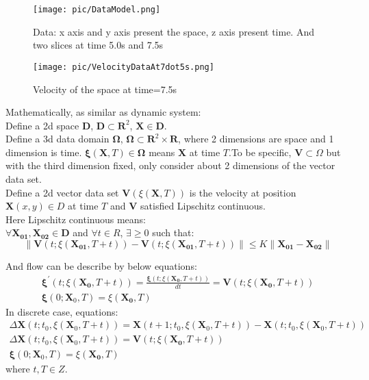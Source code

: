 \documentclass[
     11pt,         %
     a4paper,      %
     oneside,
     ]{article}
\newcommand{\vect}[1]{\boldsymbol{#1}}
\begin{document}
	\begin{figure}[H]
		\begin{minipage}{0.5\textwidth}
			\centering
			\texttt{[image: pic/DataModel.png]}
			\caption{\tiny Data: x axis and y axis present the space, z axis present time. And two slices at time 5.0s and 7.5s}
			\label{fig:DataModel}
		\end{minipage}
		\begin{minipage}{0.5\textwidth}
			\centering
			\texttt{[image: pic/VelocityDataAt7dot5s.png]}
			\caption{\tiny Velocity of the space at time=7.5s}
			\label{fig:VelocityDataAt7.5s}
		\end{minipage}
	\end{figure}	
	Mathematically, as similar as dynamic system:\\
	Define a 2d space $\vect{D}$,  $\vect{D}\subset \vect{R}^{2}$, $\vect{X}\in \vect{D}$.\\
	Define a 3d data domain $\vect{\Omega}$, $\vect{\Omega} \subset \vect{R}^{2}\times\vect{R}$, where 2 dimensions are space and 1 dimension is time. $\vect{\xi}(\vect{X},T) \in \vect{\Omega}$ means $\vect{X}$ at time $T$.To be specific, $\vect{V}\subset \Omega$ but with the third dimension fixed, only consider about 2 dimensions of the vector data set.\\
	Define a 2d vector data set $\vect{V}(\xi(\vect{X},T))$ is the velocity at position $\vect{X}(x,y) \in D$ at time $T$ and $\vect{V}$ satisfied Lipschitz continuous.\\
	Here Lipschitz continuous means:\\
	$\forall\vect{X_{01}}, \vect{X_{02}}\in \vect{D}$ and $\forall t\in R$, $\exists\geq0$ such that:\\
	$$\lVert \vect{V}(t;\xi(\vect{X_{01}},T+t))-\vect{V}(t;\xi(\vect{X_{01}},T+t))\rVert\leq K\lVert\vect{X_{01}}-\vect{X_{02}}\rVert$$

	And flow can be describe by below equations:\\
	\begin{eqnarray}
	\vect{\xi}^{'}(t;\xi(\vect{X_{0}},T+t))=\frac{\vect{\xi}(t;\xi(\vect{X_{0}},T+t))}{dt}=\vect{V}(t;\xi(\vect{X_{0}},T+t))\\
	\vect{\xi}(0;\vect{X}_{0},T)=\xi(\vect{X_{0}},T)
	\end{eqnarray}
	In discrete case, equations:
	\begin{eqnarray}
	\Delta\vect{X}(t;t_{0},\xi(\vect{X}_{0},T+t))=\vect{X}(t+1;t_{0},\xi(\vect{X}_{0},T+t))-\vect{X}(t;t_{0},\xi(\vect{X}_{0},T+t))\\
	\Delta\vect{X}(t;t_{0},\xi(\vect{X}_{0},T+t))=\vect{V}(t;\xi(\vect{X_{0}},T+t))\\
	\vect{\xi}(0;\vect{X}_{0},T)=\xi(\vect{X_{0}},T)
	\end{eqnarray}
	where $t, T\in Z$. 
\end{document}
